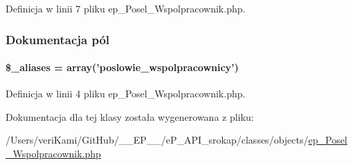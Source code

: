 Definicja w linii 7 pliku ep\-\_\-\-Posel\-\_\-\-Wspolpracownik.\-php.



\subsubsection{Dokumentacja pól}
\hypertarget{classep___posel___wspolpracownik_ab4e31d75f0bc5d512456911e5d01366b}{
\paragraph[{\$\-\_\-aliases}]{\setlength{\rightskip}{0pt plus 5cm}\$\-\_\-aliases = array('poslowie\-\_\-wspolpracownicy')}}\label{classep___posel___wspolpracownik_ab4e31d75f0bc5d512456911e5d01366b}


Definicja w linii 4 pliku ep\-\_\-\-Posel\-\_\-\-Wspolpracownik.\-php.



Dokumentacja dla tej klasy została wygenerowana z pliku\-:\begin{DoxyCompactItemize}
\item 
/\-Users/veri\-Kami/\-Git\-Hub/\-\_\-\-\_\-\-E\-P\-\_\-\-\_\-/e\-P\-\_\-\-A\-P\-I\-\_\-srokap/classes/objects/\hyperlink{ep___posel___wspolpracownik_8php}{ep\-\_\-\-Posel\-\_\-\-Wspolpracownik.\-php}\end{DoxyCompactItemize}
